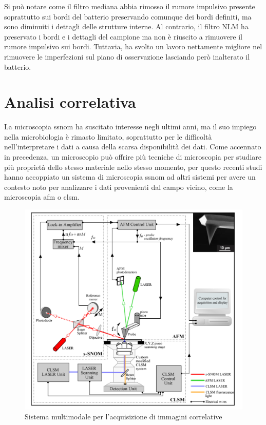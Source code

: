 \documentclass[../main.tex]{subfiles}
\begin{document}
Si può notare come il filtro mediana abbia rimosso il rumore impulsivo presente soprattutto sui bordi del batterio preservando comunque dei bordi definiti, ma sono diminuiti i dettagli delle strutture interne. Al contrario, il filtro NLM ha preservato i bordi e i dettagli del campione ma non è riuscito a rimuovere il rumore impulsivo sui bordi. Tuttavia, ha svolto un lavoro nettamente migliore nel rimuovere le imperfezioni sul piano di osservazione lasciando però inalterato il batterio.

\section{Analisi correlativa}
La microscopia \acrshort{ssnom} ha suscitato interesse negli ultimi anni, ma il suo impiego nella \gls{microbiologia} è rimasto limitato, soprattutto per le difficoltà nell'interpretare i dati a causa della scarsa disponibilità dei dati. Come accennato in precedenza, un microscopio può offrire più tecniche di microscopia per studiare più proprietà dello stesso materiale nello stesso momento, per questo recenti studi hanno accoppiato un sistema di microscopia \acrshort{ssnom} ad altri sistemi per avere un contesto noto per analizzare i dati provenienti dal campo vicino, come la microscopia \acrfull{afm} o \acrshort{clsm}.\cite{stanciu_2017}\\

\begin{figure}[h]
	\centering
	\includegraphics[keepaspectratio, height=\linewidth]{images/multimodal_system.jpg}
	\caption[Sistema multimodale per l'acquisizione di immagini correlative]{
		Sistema multimodale per l'acquisizione di immagini correlative \cite{stanciu_2017}}
	\label{fig:multimodal_system}
\end{figure}
\end{document}
